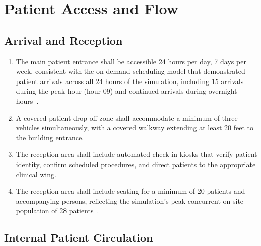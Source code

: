 \section{Patient Access and Flow}

\subsection{Arrival and Reception}

\begin{enumerate}[label=(\alph*)]
\item The main patient entrance shall be accessible 24 hours per day, 7 days
  per week, consistent with the on-demand scheduling model that demonstrated
  patient arrivals across all 24 hours of the simulation, including 15
  arrivals during the peak hour (hour 09) and continued arrivals during
  overnight hours~\cite{newtrial2026}.

\item A covered patient drop-off zone shall accommodate a minimum of three
  vehicles simultaneously, with a covered walkway extending at least 20 feet
  to the building entrance.

\item The reception area shall include automated check-in kiosks that verify
  patient identity, confirm scheduled procedures, and direct patients to the
  appropriate clinical wing.

\item The reception area shall include seating for a minimum of 20 patients and
  accompanying persons, reflecting the simulation's peak concurrent on-site
  population of 28 patients~\cite{newtrial2026}.
\end{enumerate}

\subsection{Internal Patient Circulation}

